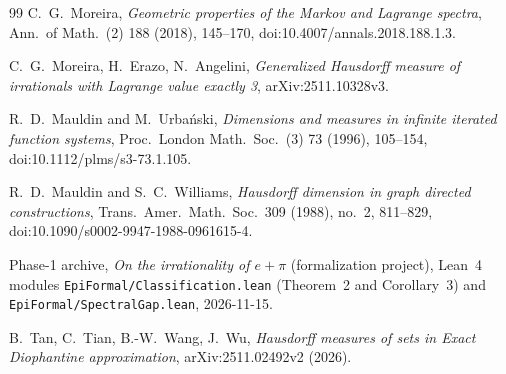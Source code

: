 \documentclass[11pt]{article}
\theoremstyle{definition}
\theoremstyle{remark}
\begin{document}
\begin{thebibliography}{99}
 C.~G.~Moreira, \emph{Geometric properties of the Markov and
Lagrange spectra}, Ann.\ of Math.\ (2) 188 (2018), 145--170,
doi:10.4007/annals.2018.188.1.3.

 C.~G.~Moreira, H.~Erazo, N.~Angelini,
\emph{Generalized Hausdorff measure of irrationals with Lagrange value exactly 3},
arXiv:2511.10328v3.

{\sloppy
{} R.~D.~Mauldin and M.~Urba\'nski, \emph{Dimensions and measures in
infinite iterated function systems}, Proc.\ London Math.\ Soc.\ (3) 73 (1996),
105--154, doi:10.1112/plms/s3-73.1.105.
}

{\sloppy
{} R.~D.~Mauldin and S.~C.~Williams,
\emph{Hausdorff dimension in graph directed constructions},
Trans.~Amer.~Math.~Soc.~309 (1988), no.~2, 811--829, doi:10.1090/s0002-9947-1988-0961615-4.
}

 Phase-1 archive, \emph{On the irrationality of $e+\pi$}
(formalization project), Lean~4 modules \texttt{EpiFormal/\allowbreak Classification.lean}
(Theorem~2 and Corollary~3) and \texttt{EpiFormal/\allowbreak Spectral\allowbreak Gap.lean}, 2026-11-15.

 B.~Tan, C.~Tian, B.-W.~Wang, J.~Wu, \emph{Hausdorff measures of
sets in Exact Diophantine approximation}, arXiv:2511.02492v2 (2026).
\end{thebibliography}
\end{document}
